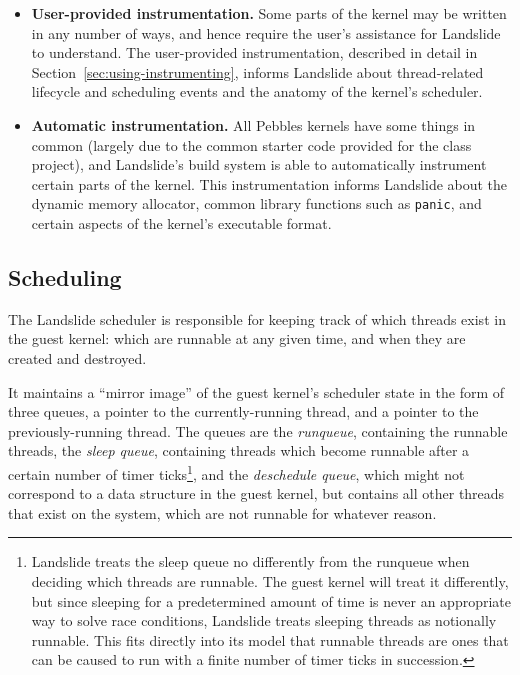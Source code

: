 \begin{itemize}
	\item {\bf User-provided instrumentation.} Some parts of the kernel may be written in any number of ways, and hence require the user's assistance for Landslide to understand. The user-provided instrumentation, described in detail in Section~\ref{sec:using-instrumenting}, informs Landslide about thread-related lifecycle and scheduling events and the anatomy of the kernel's scheduler.
	\item {\bf Automatic instrumentation.} All Pebbles kernels have some things in common (largely due to the common starter code provided for the class project), and Landslide's build system is able to automatically instrument certain parts of the kernel. This instrumentation informs Landslide about the dynamic memory allocator, common library functions such as \texttt{panic}, and certain aspects of the kernel's executable format.
\end{itemize}

\subsection{Scheduling}
\label{sec:components-sched}

The Landslide scheduler is responsible for keeping track of which threads exist in the guest kernel: which are runnable at any given time, and when they are created and destroyed.

It maintains a ``mirror image'' of the guest kernel's scheduler state in the form of three queues, a pointer to the currently-running thread, and a pointer to the previously-running thread. The queues are the {\em runqueue}, containing the runnable threads, the {\em sleep queue}, containing threads which become runnable after a certain number of timer ticks\footnote{
Landslide treats the sleep queue no differently from the runqueue when deciding which threads are runnable. The guest kernel will treat it differently, but since sleeping for a predetermined amount of time is never an appropriate way to solve race conditions, Landslide treats sleeping threads as notionally runnable. This fits directly into its model that runnable threads are ones that can be caused to run with a finite number of timer ticks in succession.},
and the {\em deschedule queue}, which might not correspond to a data structure in the guest kernel, but contains all other threads that exist on the system, which are not runnable for whatever reason.


